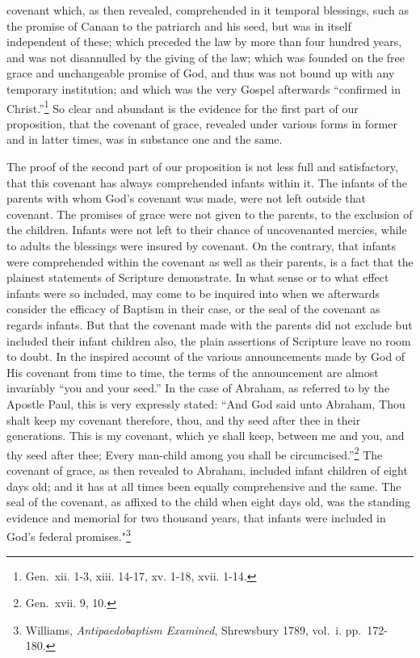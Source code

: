 \documentclass[]{book}
\begin{document}
covenant which, as then revealed, comprehended in it temporal blessings, such as the promise of Canaan to the patriarch and his seed, but was in itself independent of these; which preceded the law by more than four hundred years, and was not disannulled by the giving of the law; which was founded on the free grace and unchangeable promise of God, and thus was not bound up with any temporary institution; and which was the very Gospel afterwards ``confirmed in Christ.''\footnote{Gen.~xii. 1-3, xiii. 14-17, xv. 1-18, xvii. 1-14.} So clear and abundant is the evidence for the first part of our proposition, that the covenant of grace, revealed under various forms in former and in latter times, was in substance one and the same.

The proof of the second part of our proposition is not less full and satisfactory, that this covenant has always comprehended infants within it. The infants of the parents with whom God's covenant was made, were not left outside that covenant. The promises of grace were not given to the parents, to the exclusion of the children. Infants were not left to their chance of uncovenanted mercies, while to adults the blessings were insured by covenant. On the contrary, that infants were comprehended within the covenant as well as their parents, is a fact that the plainest statements of Scripture demonstrate. In what sense or to what effect infants were so included, may come to be inquired into when we afterwards consider the efficacy of Baptism in their case, or the seal of the covenant as regards infants. But that the covenant made with the parents did not exclude but included their infant children also, the plain assertions of Scripture leave no room to doubt. In the inspired account of the various announcements made by God of His covenant from time to time, the terms of the announcement are almost invariably ``you and your seed.'' In the case of Abraham, as referred to by the Apostle Paul, this is very expressly stated: ``And God said unto Abraham, Thou shalt keep my covenant therefore, thou, and thy seed after thee in their generations. This is my covenant, which ye shall keep, between me and you, and thy seed after thee; Every man-child among you shall be circumcised.''\footnote{Gen.~xvii. 9, 10.} The covenant of grace, as then revealed to Abraham, included infant children of eight days old; and it has at all times been equally comprehensive and the same. The seal of the covenant, as affixed to the child when eight days old, was the standing evidence and memorial for two thousand years, that infants were included in God's federal promises."\footnote{Williams, \emph{Antipaedobaptism Examined}, Shrewsbury 1789, vol.~i. pp.~172- 180.}
\end{document}
